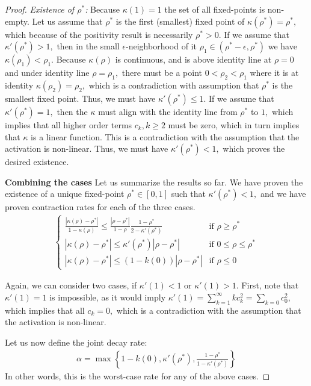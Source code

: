 \begin{proof}
\textit{Existence of $\rho^*$:} Because $\kappa(1)=1$ the set of all fixed-points is non-empty. Let us assume that $\rho^*$ is the first (smallest) fixed point of $\kappa(\rho^*) = \rho^*,$ which because of the positivity result is necessarily $\rho^*>0.$ If we assume that $\kappa'(\rho^*) > 1,$ then in the small $\epsilon$-neighborhood of it $\rho_1 \in(\rho^*-\epsilon,\rho^*)$ we have $\kappa(\rho_1) < \rho_1.$ Because $\kappa(\rho)$ is continuous, and is above identity line at $\rho=0$ and under identity line $\rho=\rho_1,$ there must be a point $0 < \rho_2 < \rho_1$ where it is at identity $\kappa(\rho_2) = \rho_2,$ which is a contradiction with assumption that $\rho^*$ is the smallest fixed point. Thus, we must have $\kappa'(\rho^*) \le 1.$ If we assume that $\kappa'(\rho^*) = 1,$ then the $\kappa$ must align with the identity line from $\rho^*$ to $1,$ which implies that all higher order terms $c_k,k\ge 2$ must be zero, which in turn implies that $\kappa$ is a linear function. This is a contradiction with the assumption that the activation is non-linear. Thus, we must have $\kappa'(\rho^*) < 1,$ which proves the desired existence. 

\textbf{Combining the cases}
Let us summarize the results so far. We have proven the existence of a unique fixed-point $\rho^*\in[0,1]$ such that $\kappa'(\rho^*)< 1,$ and we have proven contraction rates for each of the three cases.
\begin{align*}
\begin{cases}
\frac{|\kappa(\rho)-\rho^*|}{1-\kappa(\rho)} \le \frac{|\rho-\rho^*|}{1-\rho}\frac{1-\rho^*}{2-\kappa'(\rho^*)} & \text{if } \rho \ge \rho^* \\
|\kappa(\rho)-\rho^*| \le \kappa'(\rho^*)|\rho-\rho^*| & \text{if } 0 \le \rho \le \rho^*\\
|\kappa(\rho)-\rho^*| \le (1 - k(0))|\rho-\rho^*| & \text{if } \rho \le 0 
\end{cases}
\end{align*}

Again, we can consider two cases, if $\kappa'(1)<1$ or $\kappa'(1)>1.$ First, note that $\kappa'(1)=1$ is impossible, as it would imply $\kappa'(1)=\sum_{k=1}^\infty k c_k^2 = \sum_{k=0}c_0^2 ,$ which implies that all $c_k=0,$ which is a contradiction with the assumption that the activation is non-linear.

Let us now define the joint decay rate:
\begin{align*}
\alpha = \max\left\{1 - k(0), \kappa'(\rho^*), \frac{1-\rho^*}{1-\kappa'(\rho^*)}\right\}
\end{align*}
In other words, this is the worst-case rate for any of the above cases. 


\end{proof}
